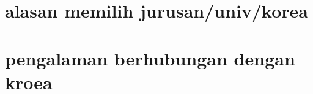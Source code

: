 \documentclass[11pt]{simart} %
\begin{document}
\section*{alasan memilih jurusan/univ/korea}
\section*{pengalaman berhubungan dengan kroea}
















%

%
\end{document}
